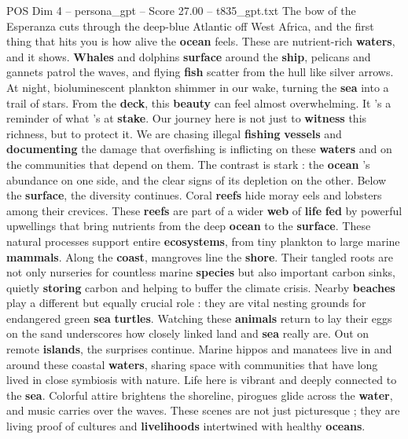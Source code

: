 \begin{textsample}{POS Dim 4 – persona\_gpt – Score 27.00 – t835\_gpt.txt}  \label{ex:f4_pos_028}
The bow of the Esperanza cuts through the deep-blue Atlantic off West Africa, and the first thing that hits you is how alive the \textbf{ocean} feels.
These are nutrient-rich \textbf{waters}, and it shows. \textbf{Whales} and dolphins \textbf{surface} around the \textbf{ship}, pelicans and gannets patrol the waves, and flying \textbf{fish} scatter from the hull like silver arrows.
At night, bioluminescent plankton shimmer in our wake, turning the \textbf{sea} into a trail of stars.
From the \textbf{deck}, this \textbf{beauty} can feel almost overwhelming.
It ’s a reminder of what ’s at \textbf{stake}.
Our journey here is not just to \textbf{witness} this richness, but to protect it.
We are chasing illegal \textbf{fishing} \textbf{vessels} and \textbf{documenting} the damage that overfishing is inflicting on these \textbf{waters} and on the communities that depend on them.
The contrast is stark : the \textbf{ocean} ’s abundance on one side, and the clear signs of its depletion on the other.
Below the \textbf{surface}, the diversity continues.
Coral \textbf{reefs} hide moray eels and lobsters among their crevices.
These \textbf{reefs} are part of a wider \textbf{web} of \textbf{life} \textbf{fed} by powerful upwellings that bring nutrients from the deep \textbf{ocean} to the \textbf{surface}.
These natural processes support entire \textbf{ecosystems}, from tiny plankton to large marine \textbf{mammals}.
Along the \textbf{coast}, mangroves line the \textbf{shore}.
Their tangled roots are not only nurseries for countless marine \textbf{species} but also important carbon sinks, quietly \textbf{storing} carbon and helping to buffer the climate crisis.
Nearby \textbf{beaches} play a different but equally crucial role : they are vital nesting grounds for endangered green \textbf{sea} \textbf{turtles}.
Watching these \textbf{animals} return to lay their eggs on the sand underscores how closely linked land and \textbf{sea} really are.
Out on remote \textbf{islands}, the surprises continue.
Marine hippos and manatees live in and around these coastal \textbf{waters}, sharing space with communities that have long lived in close symbiosis with nature.
Life here is vibrant and deeply connected to the \textbf{sea}.
Colorful attire brightens the shoreline, pirogues glide across the \textbf{water}, and music carries over the waves.
These scenes are not just picturesque ; they are living proof of cultures and \textbf{livelihoods} intertwined with healthy \textbf{oceans}.

\end{textsample}
